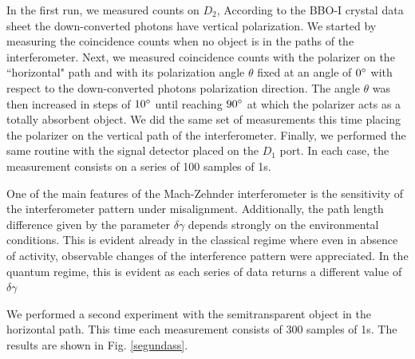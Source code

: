\documentclass[12pt]{book}
\begin{document}
In the first run, we measured counts on $D_{2}$, According to the BBO-I crystal data sheet the down-converted photons have vertical polarization. We started by measuring the coincidence counts when no object is in the paths of the interferometer. Next,  we measured coincidence counts with the polarizer on the ``horizontal" path and with its polarization angle $\theta$ fixed at an angle of $0\degree$ with respect to the down-converted photons polarization direction. The angle $\theta$ was then increased in steps of $10\degree$ until reaching $90\degree$ at which the polarizer acts as a totally absorbent object. We did the same set of measurements this time placing the polarizer on the vertical path of the interferometer. Finally, we performed the same routine with the signal detector placed on the $D_{1}$ port. In each case, the measurement consists on a series of 100 samples of 1s.


 
 

One of the main features of the Mach-Zehnder interferometer is the sensitivity of the interferometer pattern under misalignment. Additionally, the path length difference given by the parameter $\delta\gamma$ depends strongly on the environmental conditions. This is evident already in the classical regime where even in absence of activity, observable changes of the interference pattern were appreciated. In the quantum regime, this is evident as each series of data returns a different value of $\delta\gamma$

We performed a second experiment with the semitransparent object in the horizontal path. This time each measurement consists of 300 samples of 1s. The results are shown in Fig. \ref{segundass}.
\end{document}
